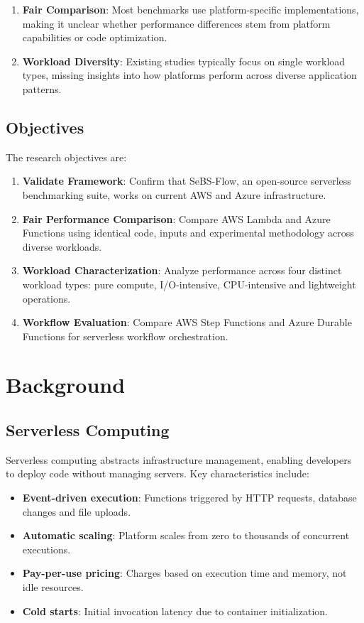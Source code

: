 \documentclass[sigconf,nonacm]{acmart}
\begin{document}
\begin{enumerate}
    \item \textbf{Fair Comparison}: Most benchmarks use platform-specific implementations, making it unclear whether performance differences stem from platform capabilities or code optimization.
    \item \textbf{Workload Diversity}: Existing studies typically focus on single workload types, missing insights into how platforms perform across diverse application patterns.
\end{enumerate}

\subsection{Objectives}

The research objectives are:

\begin{enumerate}
    \item \textbf{Validate Framework}: Confirm that SeBS-Flow, an open-source serverless benchmarking suite, works on current AWS and Azure infrastructure.
    \item \textbf{Fair Performance Comparison}: Compare AWS Lambda and Azure Functions using identical code, inputs and experimental methodology across diverse workloads.
    \item \textbf{Workload Characterization}: Analyze performance across four distinct workload types: pure compute, I/O-intensive, CPU-intensive and lightweight operations.
    \item \textbf{Workflow Evaluation}: Compare AWS Step Functions and Azure Durable Functions for serverless workflow orchestration.
\end{enumerate}

\section{Background}

\subsection{Serverless Computing}

Serverless computing abstracts infrastructure management, enabling developers to deploy code without managing servers. Key characteristics include:

\begin{itemize}
    \item \textbf{Event-driven execution}: Functions triggered by HTTP requests, database changes and file uploads.
    \item \textbf{Automatic scaling}: Platform scales from zero to thousands of concurrent executions.
    \item \textbf{Pay-per-use pricing}: Charges based on execution time and memory, not idle resources.
    \item \textbf{Cold starts}: Initial invocation latency due to container initialization.
\end{itemize}
\end{document}

